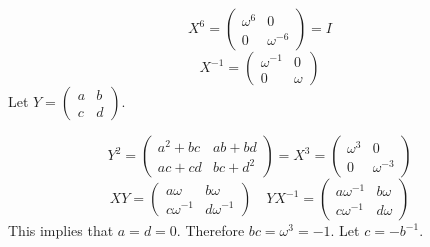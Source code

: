\begin{solution}
    \[X^6 = \begin{pmatrix} \omega^6 & 0 \\ 0 & \omega^{ - 6} \end{pmatrix} = I\]
    \[X^{ - 1} = \begin{pmatrix} \omega^{ - 1} & 0 \\ 0 & \omega \end{pmatrix}\]
    Let \(Y = \begin{pmatrix} a & b \\ c & d \end{pmatrix}\).

    \[Y^2 = \begin{pmatrix} a^2 + bc & ab + bd \\ ac + cd & bc + d^2  \end{pmatrix} = X^3 = \begin{pmatrix} \omega^3 & 0 \\ 0 & \omega^{ - 3} \end{pmatrix}\]
    \[XY = \begin{pmatrix} a\omega & b\omega \\ c \omega^{ - 1} & d \omega^{ - 1} \end{pmatrix} \quad YX^{ - 1} = \begin{pmatrix} a \omega^{ - 1} & b \omega \\ c \omega^{ - 1} & d \omega \end{pmatrix}\]
    This implies that \(a = d = 0\). Therefore \(bc = \omega^3 = - 1\). Let \(c = - b^{ - 1}\).


\end{solution}
